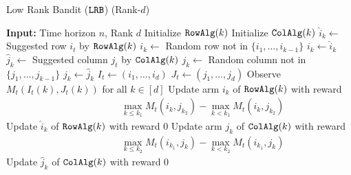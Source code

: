 \begin{algorithm}[t]
  \caption{Low Rank Bandit (${\tt LRB}$) (Rank-$d$)}
  \label{alg:LRB1}
  \begin{algorithmic}[1]
    \State \textbf{Input:} Time horizon $n$, Rank $d$
      \State Initialize ${\tt RowAlg} (k)$
      \State Initialize ${\tt ColAlg} (k)$
    \EndFor
        \State $\hat{i}_k \gets$ Suggested row $i_t$ by ${\tt RowAlg}(k)$
          \State $i_k \gets$ Random row not in $\{i_1, \dots, i_{k - 1}\}$
        \Else
          \State $i_k \gets \hat{i}_k$
        \EndIf
        \State $\hat{j}_k \gets$ Suggested column $j_t$ by ${\tt ColAlg}(k)$
          \State $j_k \gets$ Random column not in $\{j_1, \dots, j_{k - 1}\}$
        \Else
          \State $j_k \gets \hat{j}_k$
        \EndIf
      \EndFor
      \State $I_t \gets (i_1, \dots, i_d)$
      \State $J_t \gets (j_1, \dots, j_d)$
      \State Observe $M_t(I_t(k), J_t(k))$ for all $k \in [d]$
        \State Update arm $i_{k}$ of ${\tt RowAlg}(k)$ with reward
       \begin{align*}
    &\qquad \qquad \max_{k \leq k_1} M_t(i_k, j_{k_2}) - \max_{k < k_1} M_t(i_k, j_{k_2})
        \end{align*}
        \Else
          \State Update $\hat{i}_k$ of ${\tt RowAlg}(k)$ with reward $0$ 
        \EndIf
    		\State Update arm $j_{k}$ of ${\tt ColAlg}(k)$ with reward
         \begin{align*}
         &\qquad \qquad \max_{k \leq k_2} M_t(i_{k_1}, j_k)  - \max_{k < k_2} M_t(i_{k_1}, j_k)
        \end{align*}
        \Else
          \State Update $\hat{j}_k$ of ${\tt ColAlg}(k)$ with reward $0$
        \EndIf
      \EndFor
      \EndFor
     \EndFor
  \end{algorithmic}
\end{algorithm}


